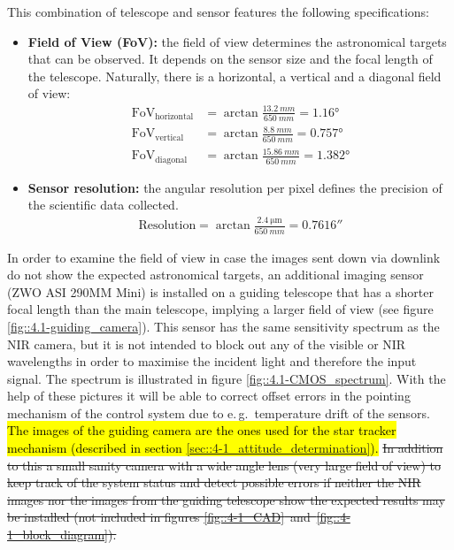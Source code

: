 This combination of telescope and sensor features the following specifications:

\begin{itemize}
	\item \textbf{Field of View (FoV):} the field of view determines the astronomical targets that can be observed. It depends on the sensor size and the focal length of the telescope. Naturally, there is a horizontal, a vertical and a diagonal field of view:
	\begin{align}
		\text{FoV}_\text{horizontal} &= \arctan \frac{\SI{13.2}{mm}}{\SI{650}{mm}} = \ang{1,16} \\
		\text{FoV}_\text{vertical} &= \arctan \frac{\SI{8.8}{mm}}{\SI{650}{mm}} = \ang{0,757} \\
		\text{FoV}_\text{diagonal} &= \arctan \frac{\SI{15,86}{mm}}{\SI{650}{mm}} = \ang{1,382}
	\end{align}
	\item \textbf{Sensor resolution:} the angular resolution per pixel defines the precision of the scientific data collected.
	\begin{align}
		\text{Resolution} = \arctan \frac{\SI{2,4}{\um}}{\SI{650}{mm}} %
		 = \ang{;;0,7616}
	\end{align}
\end{itemize}

In order to examine the field of view in case the images sent down via downlink do not show the expected astronomical targets, an additional imaging sensor (ZWO ASI 290MM Mini) is installed on a guiding telescope that has a shorter focal length than the main telescope, implying a larger field of view (see figure \ref{fig::4.1-guiding_camera}). This sensor has the same sensitivity spectrum as the NIR camera, but it is not intended to block out any of the visible or NIR wavelengths in order to maximise the incident light and therefore the input signal. The spectrum is illustrated in figure \ref{fig::4.1-CMOS_spectrum}. With the help of these pictures it will be able to correct offset errors in the pointing mechanism of the control system due to e.\,g.~temperature drift of the sensors. \hl{The images of the guiding camera are the ones used for the star tracker mechanism (described in section \mbox{\ref{sec::4-1_attitude_determination}}).} 
\st{In addition to this a small sanity camera with a wide angle lens (very large field of view) to keep track of the system status and detect possible errors if neither the NIR images nor the images from the guiding telescope show the expected results may be installed (not included in figures \mbox{\ref{fig::4-1_CAD} and \ref{fig::4-1_block_diagram}}).}



